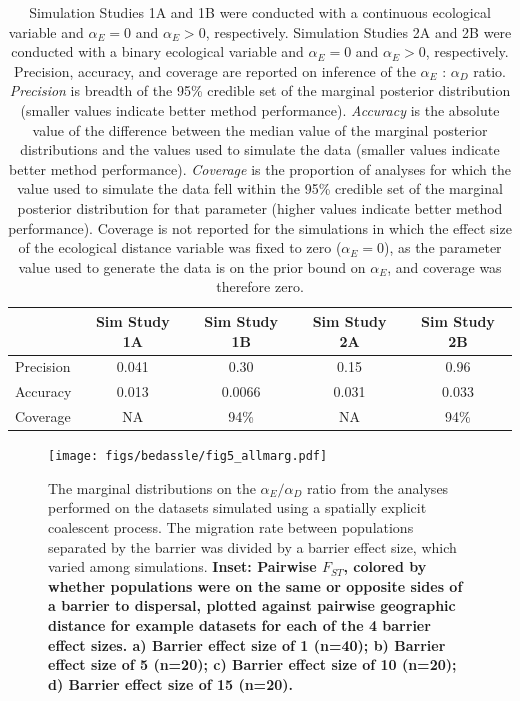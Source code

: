 \begin{table}[ht!!]
\begin{center}
\begin{tabular}{| l || c | c | c | c |}
\hline
& Sim Study 1A & Sim Study 1B & Sim Study 2A & Sim Study 2B \\ \hline
Precision & 0.041 & 0.30 & 0.15 & 0.96 \\ \hline
Accuracy & 0.013 & 0.0066 & 0.031 & 0.033 \\ \hline
Coverage & NA & 94\% & NA & 94\% \\
\hline
\end{tabular}  
\end{center}
\caption{
Simulation Studies 1A and 1B were conducted with a continuous ecological variable and $\alpha_E = 0$ and $\alpha_E > 0$, respectively.  Simulation Studies 2A and 2B were conducted with a binary ecological variable and $\alpha_E = 0$ and $\alpha_E > 0$, respectively.  Precision, accuracy, and coverage are reported on inference of the $\alpha_E$ : $\alpha_D$ ratio. \emph{Precision} is breadth of the 95\% credible set of the marginal posterior distribution (smaller values indicate better method performance).  \emph{Accuracy} is the absolute value of the difference between the median value of the marginal posterior distributions and the values used to simulate the data (smaller values indicate better method performance).  
\emph{Coverage} is the proportion  of analyses for which the value used to simulate the  data fell within the 95\% credible set of the marginal posterior distribution for that parameter (higher values indicate better method performance).  Coverage is not reported for the simulations in which the effect size of the ecological distance variable was fixed to zero ($\alpha_E = 0$), as the parameter value used to generate the data is on the prior bound on $\alpha_{E}$, and coverage was therefore zero.}
 \label{tab:sim_summs}
\end{table}

\begin{figure}[ht!]
\begin{center}
  \texttt{[image: figs/bedassle/fig5\_allmarg.pdf]}
 \caption{
 		The marginal distributions on the $\alpha_E/\alpha_D$ ratio from the analyses performed on the datasets simulated using a spatially explicit coalescent process.  The migration rate between populations separated by the barrier was divided by a barrier effect size, which varied among simulations.  \bf{Inset:}  \textmd{Pairwise $F_{ST}$, colored by whether populations were on the same or opposite sides of a barrier to dispersal, plotted against pairwise geographic distance for example datasets for each of the 4 barrier effect sizes.}
	\bf{a)}
 		\textmd{Barrier effect size of 1 (n=40);}
	\bf{b)}
 		\textmd{Barrier effect size of 5 (n=20);}
	\bf{c)}
 		\textmd{Barrier effect size of 10 (n=20);}
	\bf{d)}
 		\textmd{Barrier effect size of 15 (n=20).}
 \label{sfig:fig5_allmarg}
 }
\end{center}
\end{figure}

